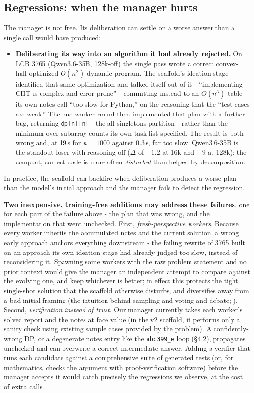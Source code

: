 \documentclass[11pt]{article}
\begin{document}
\subsection{Regressions: when the manager hurts}

The manager is not free. Its deliberation can settle on a worse answer than a single call
would have produced:

\begin{itemize}
  \item \textbf{Deliberating its way into an algorithm it had already rejected.} On LCB
  3765 (Qwen3.6-35B, 128k-off) the single pass wrote a correct convex-hull-optimized
  $O(n^2)$ dynamic program. The scaffold's ideation stage identified that same
  optimization and talked itself out of it - ``implementing CHT is complex and
  error-prone'' - committing instead to an $O(n^3)$ table its own notes call ``too slow
  for Python,'' on the reasoning that the ``test cases are weak.'' The one worker round
  then implemented that plan with a further bug, returning \texttt{dp[n][n]} - the
  all-singletons partition - rather than the minimum over subarray counts its own task
  list specified. The result is both wrong and, at 19\,s for $n = 1000$ against 0.3\,s,
  far too slow. Qwen3.6-35B is the standout loser with reasoning off ($\Delta$ of $-1.2$
  at 16k and $-9$ at 128k): the compact, correct code is more often \textit{disturbed}
  than helped by decomposition.
\end{itemize}

In practice, the scaffold can backfire when deliberation produces a worse plan than the
model's initial approach and the manager fails to detect the regression.

\textbf{Two inexpensive, training-free additions may address these failures}, one for each part of the
failure above - the plan that was wrong, and the implementation that went unchecked.
First, \textit{fresh-perspective workers}. Because every worker inherits the accumulated
notes and the current solution, a wrong early approach anchors everything downstream -
the failing rewrite of 3765 built on an approach its own ideation stage had already judged
too slow, instead of reconsidering it. Spawning some workers with the raw problem
statement and no prior context would give the manager an independent attempt to
compare against the evolving one, and keep whichever is better; in effect this protects
the tight single-shot solution that the scaffold otherwise disturbs, and diversifies away
from a bad initial framing (the intuition behind sampling-and-voting and debate;
\cite{li2024,du2023}). Second, \textit{verification instead of trust}. Our manager
currently takes each worker's solved report and the notes at face value (in the v2
scaffold, it performs only a sanity check using existing sample cases provided by the
problem). A confidently-wrong DP, or a degenerate notes entry like the \texttt{abc399\_e}
loop (\S4.2), propagates unchecked and can overwrite a correct intermediate answer. Adding
a verifier that runs each candidate against a comprehensive suite of generated
tests (or, for mathematics, checks the argument with proof-verification software) before the
manager accepts it would catch precisely the regressions we observe, at the cost of extra
calls.
\end{document}
